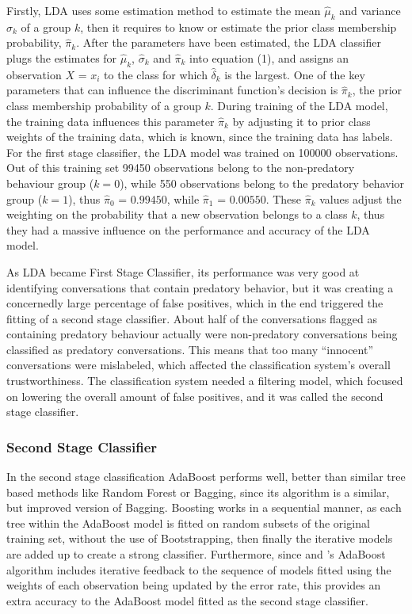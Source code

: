 \documentclass[11pt]{article}
\begin{document}
Firstly, LDA uses some estimation method to estimate the mean $\hat{\mu }_{k}$ and variance $\hat{\sigma}_{k}$ of a group $k$, then it requires to know or estimate the prior class membership probability, $\hat{\pi}_{k}$. After the parameters have been estimated, the LDA classifier plugs the estimates for $\hat{\mu }_{k}$, $\hat{\sigma}_{k}$ and $\hat{\pi}_{k}$ into equation (1), and assigns an observation $X$ = $x_i$ to the class for which $\hat{\delta}_{k}$ is the largest. One of the key parameters that can influence the discriminant function's decision is $\hat{\pi}_{k}$, the prior class membership probability of a group $k$. During training of the LDA model, the training data influences this parameter $\hat{\pi}_{k}$ by adjusting it to prior class weights of the training data, which is known, since the training data has labels. For the first stage classifier, the LDA model was trained on 100000 observations. Out of this training set 99450 observations belong to the non-predatory behaviour group ($k=0$), while 550 observations belong to the predatory behavior group ($k=1$), thus $\hat{\pi}_{0}$ = $0.99450$, while $\hat{\pi}_{1}$ = $0.00550$. These $\hat{\pi}_{k}$ values adjust the weighting on the probability that a new observation belongs to a class $k$, thus they had a massive influence on the performance and accuracy of the LDA model.

As LDA became First Stage Classifier, its performance was very good at identifying conversations that contain predatory behavior, but it was creating a concernedly large percentage of false positives, which in the end triggered the fitting of a second stage classifier. About half of the conversations flagged as containing predatory behaviour actually were non-predatory conversations being classified as predatory conversations. This means that too many ``innocent” conversations were mislabeled, which affected the classification system's overall trustworthiness. The classification system needed a filtering model, which focused on lowering the overall amount of false positives, and it was called the second stage classifier.

\subsubsection{Second Stage Classifier}
In the second stage classification AdaBoost performs well, better than similar tree based methods like Random Forest or Bagging, since its algorithm is a similar, but improved version of Bagging. Boosting works in a sequential manner, as each tree within the AdaBoost model is fitted on random subsets of the original training set, without the use of Bootstrapping, then finally the iterative models are added up to create a strong classifier. Furthermore, since \cite{freund1996experiments} and \cite{hastie2009multi}'s AdaBoost algorithm includes iterative feedback to the sequence of models fitted using the weights of each observation being updated by the error rate, this provides an extra accuracy to the AdaBoost model fitted as the second stage classifier.
\end{document}
